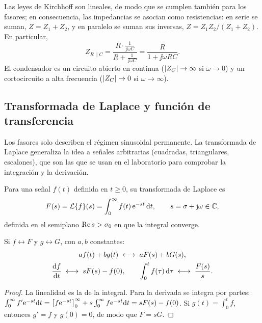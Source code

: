 Las leyes de Kirchhoff son lineales, de modo que se cumplen también para los fasores; en
consecuencia, las impedancias se asocian como resistencias: en serie se suman,
$Z=Z_1+Z_2$, y en paralelo se suman sus inversas, $Z=Z_1Z_2/(Z_1+Z_2)$. En particular,
\begin{equation}\label{eq:RC-paralelo}
  Z_{R\parallel C}=\frac{R\cdot\frac{1}{\jj\omega C}}{R+\frac{1}{\jj\omega C}}=\frac{R}{1+\jj\omega RC} .
\end{equation}
El condensador es un circuito abierto en continua ($\lvert Z_C\rvert\to\infty$ si $\omega\to0$) y un
cortocircuito a alta frecuencia ($\lvert Z_C\rvert\to0$ si $\omega\to\infty$).

\subsection{Transformada de Laplace y función de transferencia}\label{sec:transformada}
Los fasores solo describen el régimen sinusoidal permanente. La transformada de Laplace
generaliza la idea a señales arbitrarias (cuadradas, triangulares, escalones), que son las que
se usan en el laboratorio para comprobar la integración y la derivación.

\begin{definicion}\label{def:laplace}
Para una señal $f(t)$ definida en $t\ge0$, su transformada de Laplace es
\begin{equation}\label{eq:laplace}
  F(s)=\mathcal{L}\{f\}(s)=\int_{0}^{\infty}f(t)\,\mathrm{e}^{-st}\,\mathrm{d} t,\qquad s=\sigma+\mathrm{j}\omega\in\mathbb{C},
\end{equation}
definida en el semiplano $\operatorname{Re} s>\sigma_0$ en que la integral converge.
\end{definicion}

\begin{proposicion}\label{prop:laplace}
Si $f\leftrightarrow F$ y $g\leftrightarrow G$, con $a,b$ constantes:
\begin{gather}
  af(t)+bg(t)\;\longleftrightarrow\;aF(s)+bG(s),\label{eq:L-lineal}\\
  \frac{\mathrm{d} f}{\mathrm{d} t}\;\longleftrightarrow\;sF(s)-f(0),\qquad
  \int_{0}^{t}f(\tau)\,\mathrm{d}\tau\;\longleftrightarrow\;\frac{F(s)}{s}.\label{eq:L-derivada}
\end{gather}
\end{proposicion}
\begin{proof}
La linealidad es la de la integral. Para la derivada se integra por partes:
$\int_0^\infty f'\mathrm{e}^{-st}\mathrm{d} t=\bigl[f\mathrm{e}^{-st}\bigr]_0^\infty+s\int_0^\infty f\mathrm{e}^{-st}\mathrm{d} t=sF(s)-f(0)$.
Si $g(t)=\int_0^t f$, entonces $g'=f$ y $g(0)=0$, de modo que $F=sG$.
\end{proof}

